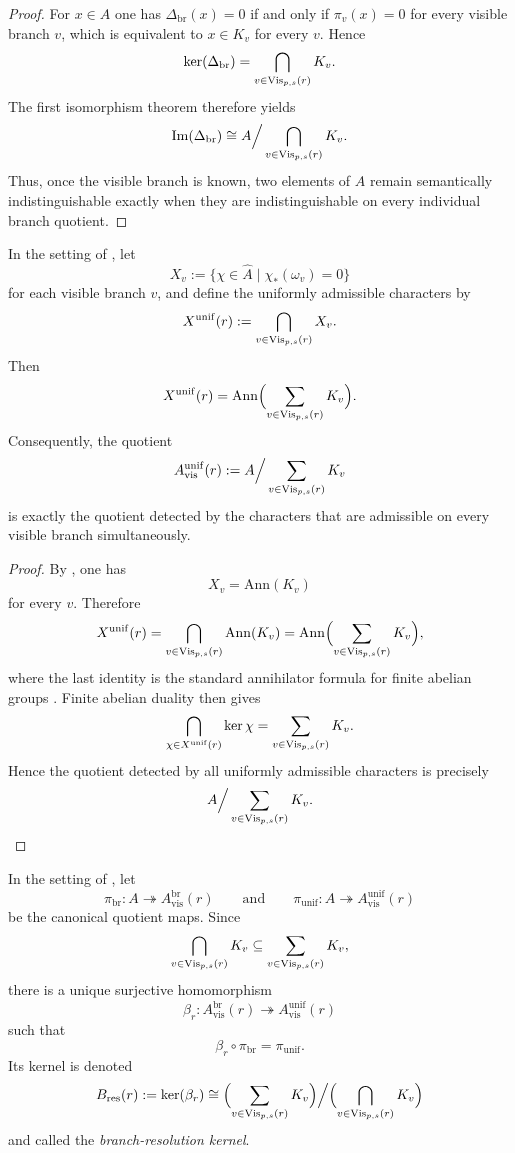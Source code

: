 \begin{proof}
For $x\in A$ one has $\Delta_{\mathrm{br}}(x)=0$ if and only if $\pi_v(x)=0$ for every visible branch $v$, which is equivalent to $x\in K_v$ for every $v$. Hence
\[
\ker(\Delta_{\mathrm{br}})=\bigcap_{v\in \mathrm{Vis}_{p,s}(r)} K_v.
\]
The first isomorphism theorem therefore yields
\[
\mathrm{Im}(\Delta_{\mathrm{br}})
\cong
A\Big/\bigcap_{v\in \mathrm{Vis}_{p,s}(r)} K_v.
\]
Thus, once the visible branch is known, two elements of $A$ remain semantically indistinguishable exactly when they are indistinguishable on every individual branch quotient.
\end{proof}

\begin{proposition}\label{thm:branch-uniform-visible-quotient}
In the setting of , let
\[
X_v:=\{\chi\in \widehat A\mid \chi_*(\omega_v)=0\}
\]
for each visible branch $v$, and define the uniformly admissible characters by
\[
X^{\mathrm{unif}}(r):=\bigcap_{v\in \mathrm{Vis}_{p,s}(r)} X_v.
\]
Then
\[
X^{\mathrm{unif}}(r)=\mathrm{Ann}\Bigl(\sum_{v\in \mathrm{Vis}_{p,s}(r)} K_v\Bigr).
\]
Consequently, the quotient
\[
A_{\mathrm{vis}}^{\mathrm{unif}}(r):=A\Big/\sum_{v\in \mathrm{Vis}_{p,s}(r)} K_v
\]
is exactly the quotient detected by the characters that are admissible on every visible branch simultaneously.
\end{proposition}

\begin{proof}
By , one has
\[
X_v=\mathrm{Ann}(K_v)
\]
for every $v$. Therefore
\[
X^{\mathrm{unif}}(r)
=
\bigcap_{v\in \mathrm{Vis}_{p,s}(r)} \mathrm{Ann}(K_v)
=
\mathrm{Ann}\Bigl(\sum_{v\in \mathrm{Vis}_{p,s}(r)} K_v\Bigr),
\]
where the last identity is the standard annihilator formula for finite abelian groups \cite[Part~I, Chap.~2]{Terras1999}. Finite abelian duality then gives
\[
\bigcap_{\chi\in X^{\mathrm{unif}}(r)} \ker\chi
=
\sum_{v\in \mathrm{Vis}_{p,s}(r)} K_v.
\]
Hence the quotient detected by all uniformly admissible characters is precisely
\[
A\Big/\sum_{v\in \mathrm{Vis}_{p,s}(r)} K_v.
\qedhere
\]
\end{proof}

\begin{definition}\label{def:branch-comparison-map}
In the setting of , let
\[
\pi_{\mathrm{br}}:A\twoheadrightarrow A_{\mathrm{vis}}^{\mathrm{br}}(r)
\qquad\text{and}\qquad
\pi_{\mathrm{unif}}:A\twoheadrightarrow A_{\mathrm{vis}}^{\mathrm{unif}}(r)
\]
be the canonical quotient maps. Since
\[
\bigcap_{v\in \mathrm{Vis}_{p,s}(r)} K_v
\subseteq
\sum_{v\in \mathrm{Vis}_{p,s}(r)} K_v,
\]
there is a unique surjective homomorphism
\[
\beta_r:A_{\mathrm{vis}}^{\mathrm{br}}(r)\twoheadrightarrow A_{\mathrm{vis}}^{\mathrm{unif}}(r)
\]
such that
\[
\beta_r\circ \pi_{\mathrm{br}}=\pi_{\mathrm{unif}}.
\]
Its kernel is denoted
\[
B_{\mathrm{res}}(r):=
\ker(\beta_r)
\cong
\Bigl(\sum_{v\in \mathrm{Vis}_{p,s}(r)} K_v\Bigr)\Big/\Bigl(\bigcap_{v\in \mathrm{Vis}_{p,s}(r)} K_v\Bigr)
\]
and called the \emph{branch-resolution kernel}.
\end{definition}

